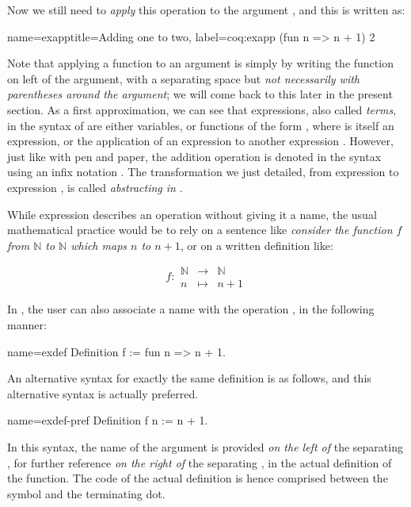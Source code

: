 Now we still need to \emph{apply} this operation to the argument
, and this is written as:

\begin{coq}{name=exapp}{title=Adding one to two, label=coq:exapp}
  (fun n => n + 1) 2
\end{coq}
Note that applying a function to an argument is simply by writing the
function on left of the argument, with a separating space but {\em not
  necessarily with parentheses around the argument}; we will come back to this
later in the present section. As a first approximation, we can see
that expressions, also called \emph{terms}, in the syntax of \Coq{}
are either variables, or
functions of the form , where  is itself an
expression, or the application  of an expression  to
another expression . However, just like with pen and paper, the addition
operation is denoted in the \Coq{} syntax using an infix notation \C{+}.
The transformation we just detailed, from expression  to expression
, is called \emph{abstracting  in  }.

While expression  describes an operation
without giving it a name, the usual mathematical practice would be to
rely on a sentence like {\em consider the function \(f\) from {\(\mathbb{N}\)}
to {\(\mathbb{N}\)} which maps \(n\) to \(n + 1\)}, or on a written
definition like:

\begin{equation}\label{equation:f}
f :
\begin{array}{ccc}
{\mathbb{N}} &\rightarrow& {\mathbb{N}}\\
n &\mapsto& n + 1
\end{array}
\end{equation}

In \Coq{}, the user can also associate a name with the operation
, in the following manner:

\begin{coq}{name=exdef}{}
Definition f := fun n => n + 1.
\end{coq}
An alternative syntax for exactly the same definition is as follows,
and this alternative syntax is actually preferred.

\begin{coq}{name=exdef-pref}{}
Definition f n := n + 1.
\end{coq}
In this syntax, the name of the argument  is provided
\emph{on the left of} the separating \C{:=}, for further reference
\emph{on the right of} the separating \C{:=}, in the actual
definition of the function. The code of the actual definition is
hence comprised between the \C{:=} symbol and the terminating dot.

